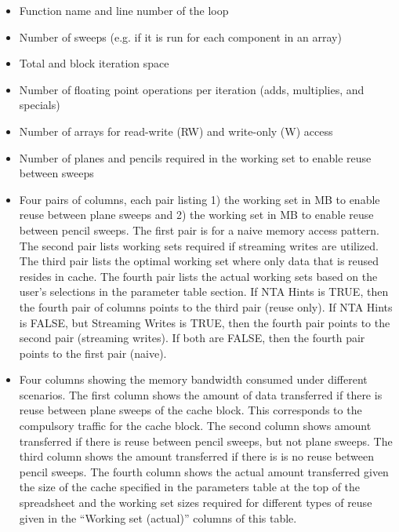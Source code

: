 \begin{itemize}

\item Function name and line number of the loop

\item Number of sweeps (e.g. if it is run for each component in an array)

\item Total and block iteration space

\item Number of floating point operations per iteration (adds, multiplies,
and specials)

\item Number of arrays for read-write (RW) and write-only (W) access

\item Number of planes and pencils required in the working set to enable
reuse between sweeps

\item Four pairs of columns, each pair listing 1) the working set in MB
      to enable reuse between plane sweeps and 2) the working set in MB
      to enable reuse between pencil sweeps.  The first pair is for a
      naive memory access pattern.  The second pair lists working sets
      required if streaming writes are utilized.  The third pair lists
      the optimal working set where only data that is reused resides
      in cache.  The fourth pair lists the actual working sets based on
      the user's selections in the parameter table section.  If NTA Hints
      is TRUE, then the fourth pair of columns points to the third pair
      (reuse only).  If NTA Hints is FALSE, but Streaming Writes is TRUE,
      then the fourth pair points to the second pair (streaming writes).
      If both are FALSE, then the fourth pair points to the first pair
      (naive).

\item Four columns showing the memory bandwidth consumed under different
      scenarios.  The first column shows the amount of data transferred
      if there is reuse between plane sweeps of the cache block.
      This corresponds to the compulsory traffic for the cache block.
      The second column shows amount transferred if there is reuse between
      pencil sweeps, but not plane sweeps.  The third column shows the
      amount transferred if there is is no reuse between pencil sweeps.
      The fourth column shows the actual amount transferred given the
      size of the cache specified in the parameters table at the top of
      the spreadsheet and the working set sizes required for different
      types of reuse given in the ``Working set (actual)'' columns of
      this table.


\end{itemize}
